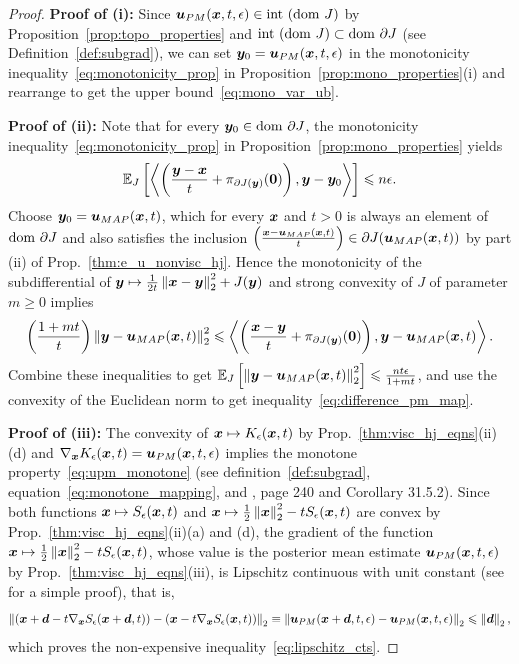 \begin{proof}
\textbf{Proof of (i):}  Since $\boldsymbol{u}_{PM}(\boldsymbol{x},t,\epsilon) \in \mathrm{int~}(\mathrm{dom~} J)$ by Proposition~\ref{prop:topo_properties} and $\mathrm{int~}(\mathrm{dom~} J) \subset \mathrm{dom~} \partial J$ (see Definition~\ref{def:subgrad}), we can set $\boldsymbol{y}_0 = \boldsymbol{u}_{PM}(\boldsymbol{x},t,\epsilon)$ in the monotonicity inequality~\eqref{eq:monotonicity_prop} in Proposition~\ref{prop:mono_properties}(i) and rearrange to get the upper bound~\eqref{eq:mono_var_ub}.

\textbf{Proof of (ii):}  Note that for every $\boldsymbol{y}_0 \in \mathrm{dom~}\partial J$, the monotonicity inequality~\eqref{eq:monotonicity_prop} in Proposition~\ref{prop:mono_properties} yields
\[
\mathbb{E}_{J}\left [{\left\langle \left(\frac{\boldsymbol{y} - \boldsymbol{x}}{t} + \pi_{\partial J(\boldsymbol{y})}(\boldsymbol{0})\right),\boldsymbol{y}-\boldsymbol{y}_{0}\right\rangle}\right] \leqslant n\epsilon.
\]
Choose $\boldsymbol{y}_0 = \boldsymbol{u}_{MAP}(\boldsymbol{x},t)$, which for every $\boldsymbol{x}$ and $t>0$ is always an element of $\mathrm{dom~} \partial J$ and also satisfies the inclusion $\left(\frac{\boldsymbol{x}-\boldsymbol{u}_{MAP}(\boldsymbol{x},t)}{t}\right) \in \partial J(\boldsymbol{u}_{MAP}(\boldsymbol{x},t))$ by part (ii) of Prop.~\ref{thm:e_u_nonvisc_hj}. Hence the monotonicity of the subdifferential of $\boldsymbol{y} \mapsto \frac{1}{2t}\left\Vert{\boldsymbol{x}-\boldsymbol{y}} \right\Vert_{2}^{2} + J(\boldsymbol{y})$ and strong convexity of $J$ of parameter $m\geqslant0$ implies
\[
\left(\frac{1+mt}{t}\right)\left\Vert{\boldsymbol{y}-\boldsymbol{u}_{MAP}(\boldsymbol{x},t)} \right\Vert_{2}^{2} \leqslant \left\langle \left(\frac{\boldsymbol{x} - \boldsymbol{y}}{t} + \pi_{\partial J(\boldsymbol{y})}(\boldsymbol{0})\right),\boldsymbol{y}-\boldsymbol{u}_{MAP}(\boldsymbol{x},t)\right\rangle.
\]
Combine these inequalities to get $\mathbb{E}_{J}\left [{\left\Vert{\boldsymbol{y}-\boldsymbol{u}_{MAP}(\boldsymbol{x},t)} \right\Vert_{2}^{2}}\right] \leqslant \frac{nt\epsilon}{1+mt}$, and use the convexity of the Euclidean norm to get inequality~\eqref{eq:difference_pm_map}.

\textbf{Proof of (iii):} The convexity of $\boldsymbol{x} \mapsto K_{\epsilon}(\boldsymbol{x},t)$ by Prop.~\ref{thm:visc_hj_eqns}(ii)(d) and $\nabla_{\boldsymbol{x}}K_{\epsilon}(\boldsymbol{x},t) = \boldsymbol{u}_{PM}(\boldsymbol{x},t,\epsilon)$ implies the monotone property~\eqref{eq:upm_monotone} (see definition~\ref{def:subgrad}, equation~\eqref{eq:monotone_mapping}, and \cite{rockafellar1970convex}, page 240 and Corollary 31.5.2). Since both functions $\boldsymbol{x} \mapsto S_\epsilon(\boldsymbol{x},t)$ and $\boldsymbol{x} \mapsto \frac{1}{2}\left\Vert{\boldsymbol{x}} \right\Vert_{2}^{2} - tS_\epsilon(\boldsymbol{x},t)$ are convex by Prop.~\ref{thm:visc_hj_eqns}(ii)(a) and (d), the gradient of the function $\boldsymbol{x} \mapsto \frac{1}{2}\left\Vert{\boldsymbol{x}} \right\Vert_{2}^{2} - tS_\epsilon(\boldsymbol{x},t)$, whose value is the posterior mean estimate $\boldsymbol{u}_{PM}(\boldsymbol{x},t,\epsilon)$ by Prop.~\ref{thm:visc_hj_eqns}(iii), is Lipschitz continuous with unit constant (see \cite{zhou2018fenchel} for a simple proof), that is,
\[
\left\Vert \left(\boldsymbol{x}+\boldsymbol{d} - t\nabla_{\boldsymbol{x}}S_\epsilon(\boldsymbol{x}+\boldsymbol{d},t)\right) - \left(\boldsymbol{x} - t\nabla_{\boldsymbol{x}}S_\epsilon(\boldsymbol{x},t)\right) \right\Vert_2 \equiv \left\Vert\boldsymbol{u}_{PM}(\boldsymbol{x}+\boldsymbol{d},t,\epsilon) - \boldsymbol{u}_{PM}(\boldsymbol{x},t,\epsilon)\right\Vert_2 \leqslant \left\Vert\boldsymbol{d}\right\Vert_2,
\]
which proves the non-expensive inequality~\eqref{eq:lipschitz_cts}.


\end{proof}
